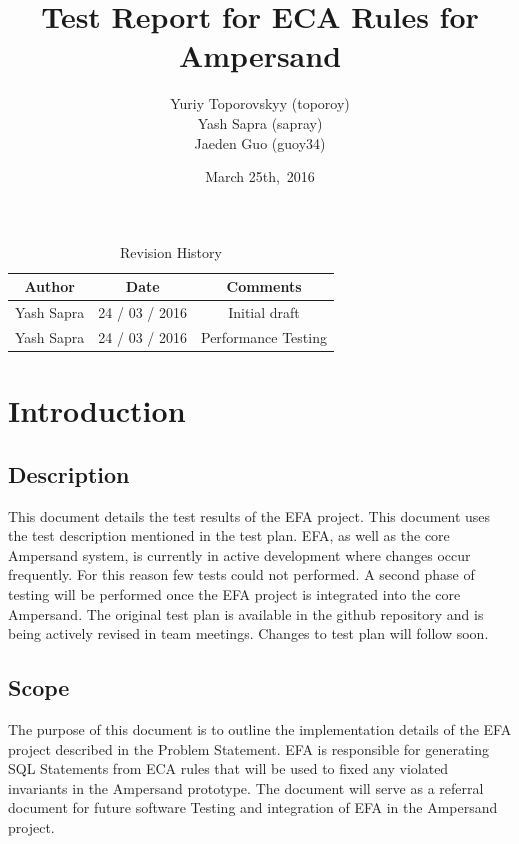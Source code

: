 \documentclass[12pt, svgnames]{article}
\begin{document}
\title{\vspace*{3cm} Test Report for ECA Rules for Ampersand} 
\author{Yuriy Toporovskyy (toporoy)\\ Yash Sapra (sapray) \\ Jaeden Guo (guoy34)}
\date{March 25th,\ 2016} 

\maketitle
\newpage
\vspace*{1cm}
\begin{table}[ht!]\begin{center}
        \caption{Revision History}  
        \begin{tabular}{|c|c|c|}\hline
            \textbf{Author} & \textbf{Date} & \textbf{Comments} \\\hline 
            Yash Sapra & 24 / 03 / 2016 & Initial draft\\\hline
	    Yash Sapra & 24 / 03 / 2016 & Performance Testing\\\hline
        \end{tabular}
    \end{center}\end{table}
\newpage

\tableofcontents

\newpage

\section{Introduction}\label{intro}

\subsection{Description}

This document details the test results of the EFA project.
This document uses the test description mentioned in the test plan.
EFA, as well as the core Ampersand system, is
currently in active development where changes occur frequently.
For this reason few tests could not performed. 
A second phase of testing will be performed 
once the EFA project is integrated into the core Ampersand. The original test plan is available in the github repository and is being actively revised in team meetings. Changes to test plan will follow soon.

\subsection{Scope}
The purpose of this document is to outline the implementation details of the 
EFA project described in the Problem Statement.
EFA is responsible for generating SQL Statements from ECA rules that will 
be used to fixed any violated invariants in the Ampersand prototype. 
The document will serve as a referral document for future software Testing and integration of EFA in the Ampersand project.
\end{document}
